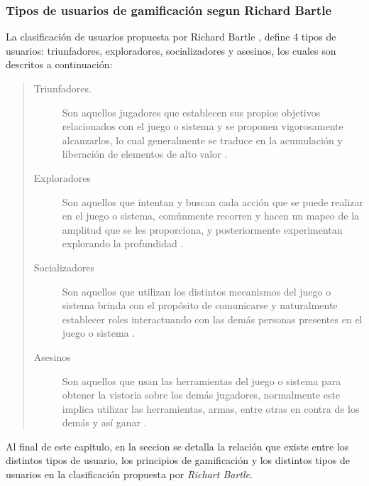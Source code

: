     \subsubsection{Tipos de usuarios de gamificación segun Richard Bartle}

    La clasificación de usuarios propuesta por Richard Bartle \cite{BartleUsuarios}, define
    4 tipos de usuarios: triunfadores, exploradores, socializadores y asesinos, los cuales son
    descritos a continuación:

        \begin{quote}
        \begin{description}
        \item[Triunfadores.]
            Son aquellos jugadores que establecen sus propios objetivos relacionados con
            el juego o sistema y se proponen vigorosamente alcanzarlos, lo cual generalmente
            se traduce en la acumulación y liberación de elementos de alto valor
            \cite[p. 3]{BartleUsuarios}.

        \item[Exploradores]
            Son aquellos que intentan y buscan cada acción que se puede realizar en el
            juego o sistema, comúnmente recorren y hacen un mapeo de la amplitud que se
            les proporciona, y posteriormente experimentan explorando la profundidad
            \cite[p. 4]{BartleUsuarios}.

        \item[Socializadores]
            Son aquellos que utilizan los distintos mecanismos del juego o sistema brinda
            con el propósito de comunicarse y naturalmente establecer roles interactuando
            con las demás personas presentes en el juego o sistema
            \cite[p. 4]{BartleUsuarios}.

        \item[Asesinos]
            Son aquellos que usan las herramientas del juego o sistema para obtener la
            vistoria sobre los demás jugadores, normalmente este implica utilizar las
            herramientas, armas, entre otras en contra de los demás y así ganar
            \cite[p. 4]{BartleUsuarios}.

        \end{description}
        \end{quote}

    \noindent
    Al final de este capitulo, en la seccion  se detalla
    la relación que existe entre los distintos tipos de usuario, los principios de
    gamificación y los distintos tipos de usuarios en la clasificación propuesta por
    {\it Richart Bartle}.


